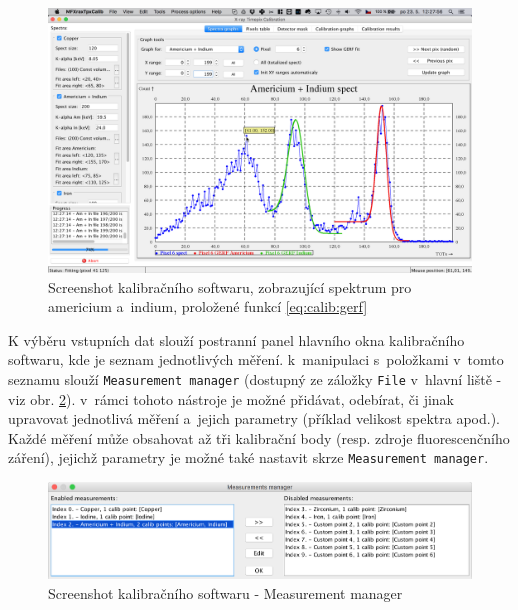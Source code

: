 \begin{figure}[t]
	\begin{center}
		\includegraphics[width=15cm]{figures/calibsw_spectra_all.png}
		\caption{Screenshot kalibračního softwaru, zobrazující spektrum pro americium a~indium, proložené funkcí \ref{eq:calib:gerf}}
		\label{fig:calib:sw_spektra}
	\end{center}
\end{figure}

K výběru vstupních dat slouží postranní panel hlavního okna kalibračního softwaru, kde je seznam jednotlivých měření. k~manipulaci s~položkami v~tomto seznamu slouží \texttt{Measurement manager} (dostupný ze záložky \texttt{File} v~hlavní liště - viz obr. \ref{fig:calib:sw_measurmanag}). v~rámci tohoto nástroje je možné přidávat, odebírat, či jinak upravovat jednotlivá měření a~jejich parametry (příklad velikost spektra apod.). Každé měření může obsahovat až tři kalibrační body (resp. zdroje fluorescenčního záření), jejichž parametry je možné také nastavit skrze \texttt{Measurement manager}.

\begin{figure}[th!]
	\begin{center}
		\includegraphics[width=15cm]{figures/calibsw_manager.png}
		\caption{Screenshot kalibračního softwaru - Measurement manager}
		\label{fig:calib:sw_measurmanag}
	\end{center}
\end{figure}

